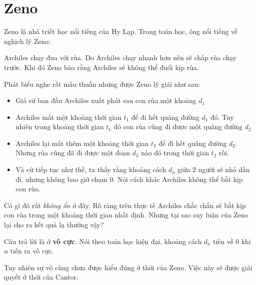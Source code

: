 \chapter{Zeno}

Zeno là nhà triết học nổi tiếng của Hy Lạp. Trong toán học, ông nổi tiếng về nghịch lý Zeno:

Archiles chạy đua với rùa. Do Archiles chạy nhanh hơn nên sẽ chấp rùa chạy trước. Khi đó Zeno bảo rằng Archiles sẽ không thể đuổi kịp rùa.

Phát biểu nghe rất mâu thuẫn nhưng được Zeno lý giải như sau:

\begin{itemize}[noitemsep]
    \item Giả sử ban đầu Archiles xuất phát sau con rùa một khoảng $d_1$
    \item Archiles mất một khoảng thời gian $t_1$ để đi hết quãng đường $d_1$ đó. Tuy nhiên trong khoảng thời gian $t_1$ đó con rùa cũng đi được một quãng đường $d_2$
    \item Archiles lại mất thêm một khoảng thời gian $t_2$ để đi hết quãng đường $d_2$. Nhưng rùa cũng đã đi được một đoạn $d_3$ nào đó trong thời gian $t_2$ rồi.
    \item Và cứ tiếp tục như thế, ta thấy rằng khoảng cách $d_n$ giữa 2 người sẽ nhỏ dần đi, nhưng không bao giờ chạm 0. Nói cách khác Archiles không thể bắt kịp con rùa.
\end{itemize}

Có gì đó rất \textit{không ổn} ở đây. Rõ ràng trên thực tế Archiles chắc chắn sẽ bắt kịp con rùa trong một khoảng thời gian nhất định. Nhưng tại sao suy luận của Zeno lại cho ra kết quả lạ thường vậy?

Câu trả lời là ở \textbf{vô cực}. Nói theo toán học hiện đại, khoảng cách $d_n$ tiến về 0 khi $n$ tiến ra vô cực.

Tuy nhiên sự vô cùng chưa được hiểu đúng ở thời của Zeno. Việc này sẽ được giải quyết ở thời của Cantor.